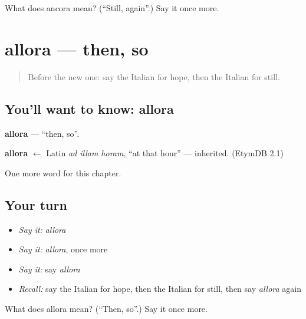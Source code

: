 \begin{tcolorbox}[breakable,colback=teal!4,colframe=teal!35!black,title={Before you move on}]
What does ancora mean? (\textquotedblleft{}Still, again\textquotedblright{}.) Say it once more.
\end{tcolorbox}
\section[allora]{allora — then, so}

\label{lesson:IT-C187-allora}



\begin{quote}
Before the new one: say the Italian for hope, then the Italian for still.
\end{quote}

\subsection*{You'll want to know: allora}
\textbf{allora} — \textquotedblleft{}then, so\textquotedblright{}.

\begin{cousinweb}
\textbf{allora} $\leftarrow$ Latin \emph{ad illam horam}, \textquotedblleft{}at that hour\textquotedblright{} — inherited. (EtymDB 2.1)
\end{cousinweb}

\begin{grammarlens}[title={What you've built}]
One more word for this chapter.
\end{grammarlens}

\subsection*{Your turn}
\begin{itemize}
\raggedright
  \item \emph{Say it:} \emph{allora}
  \item \emph{Say it:} \emph{allora}, once more
  \item \emph{Say it:} say \emph{allora}
  \item \emph{Recall:} say the Italian for hope, then the Italian for still, then say \emph{allora} again
\end{itemize}

\begin{tcolorbox}[breakable,colback=teal!4,colframe=teal!35!black,title={Before you move on}]
What does allora mean? (\textquotedblleft{}Then, so\textquotedblright{}.) Say it once more.
\end{tcolorbox}
